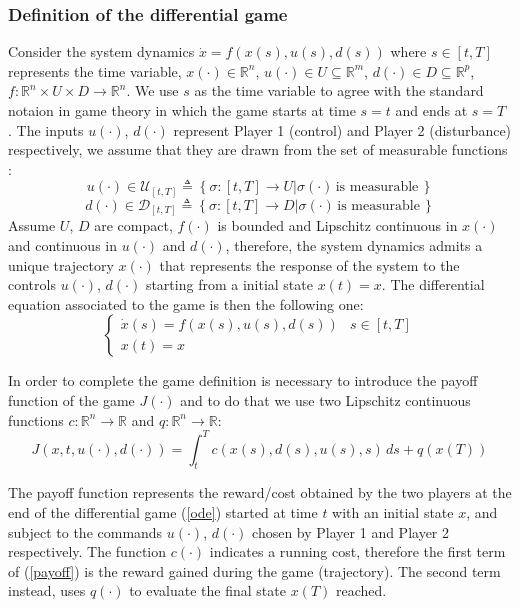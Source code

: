 \subsubsection{Definition of the differential game}
Consider the system dynamics $\dot{x}=f(x(s), u(s), d(s))$ where $s \in [t, T]$ represents the time variable, $x(\cdot)\in\mathbb{R}^n$, $u(\cdot)\in U\subseteq \mathbb{R}^m$, $d(\cdot)\in D\subseteq \mathbb{R}^p$, $f:\mathbb{R}^n \times U \times D \rightarrow \mathbb{R}^n$. We use $s$ as the time variable to agree with the standard notaion in game theory in which the game starts at time $s=t$ and ends at $s=T$ \cite{evans}.
The inputs $u(\cdot)$, $d(\cdot)$ represent Player 1 (control) and Player 2 (disturbance) respectively, we assume that they are drawn from the set of measurable functions \cite{evans}\cite{brief_intro}:
\[ 
    u(\cdot) \in \mathcal{U}_{[t, T]}  \triangleq 
    \left\{
        \sigma: [t, T] \rightarrow U| \sigma(\cdot) \, \textrm{is measurable} \, 
    \right\} 
\]
\[ 
    d(\cdot) \in \mathcal{D}_{[t, T]}  \triangleq 
    \left\{
        \sigma: [t, T] \rightarrow D| \sigma(\cdot) \, \textrm{is measurable} \, 
    \right\} 
\]
Assume $U$, $D$ are compact, $f(\cdot)$ is bounded and Lipschitz continuous in $x(\cdot)$ and continuous in $u(\cdot)$ and $d(\cdot)$, therefore, the system dynamics admits a unique trajectory $x(\cdot)$ that represents the response of the system to the controls $u(\cdot)$, $d(\cdot)$ starting from a initial state $x(t)=x$.
The differential equation associated to the game is then the following one:
\begin{equation}
	\label{ode}
	\left\{
		\begin{array}{ll}
			\dot{x}(s)=f(x(s), u(s), d(s))  & s \in [t, T] \\
			x(t) = x
		\end{array}
	\right.
\end{equation}

In order to complete the game definition is necessary to introduce the payoff function of the game $J(\cdot)$ and to do that we use two Lipschitz continuous functions $c:\mathbb{R}^n \rightarrow \mathbb{R}$ and $q:\mathbb{R}^n \rightarrow \mathbb{R}$:
\begin{equation}
	\label{payoff}
	J(x, t, u(\cdot), d(\cdot)) = \int_{t}^{T} c(x(s),d(s),u(s),s)  \,ds + q(x(T)) 
\end{equation}

The payoff function represents the reward/cost obtained by the two players at the end of the differential game (\ref{ode}) started at time $t$ with an initial state $x$, and subject to the commands  $u(\cdot)$, $d(\cdot)$ chosen by Player 1 and Player 2 respectively. The function $c(\cdot)$ indicates a running cost, therefore the first term of (\ref{payoff}) is the reward gained during the game (trajectory). The second term instead, uses $q(\cdot)$ to evaluate the final state $x(T)$ reached.
\newline

